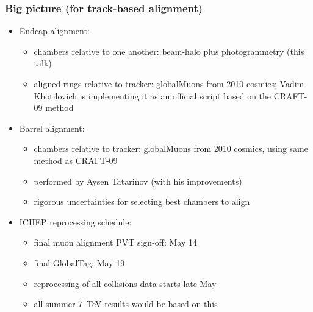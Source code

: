 \documentclass[compress]{beamer}
\begin{document}
\begin{frame}
\frametitle{Big picture {\large (for track-based alignment)}}
\begin{itemize}\setlength{\itemsep}{0.25 cm}
\item Endcap alignment:
\begin{itemize}
\item chambers relative to one another: beam-halo plus photogrammetry (this talk)
\item aligned rings relative to tracker: globalMuons from 2010 cosmics; Vadim Khotilovich is implementing it as an official script based on the CRAFT-09 method
\end{itemize}

\item Barrel alignment:
\begin{itemize}
\item chambers relative to tracker: globalMuons from 2010 cosmics, using same method as CRAFT-09
\item performed by Aysen Tatarinov (with his improvements)
\item rigorous uncertainties for selecting best chambers to align
\end{itemize}

\item ICHEP reprocessing schedule:
\begin{itemize}
\item final muon alignment PVT sign-off: May 14
\item final GlobalTag: May 19
\item reprocessing of all collisions data starts late May
\item all summer 7~TeV results would be based on this
\end{itemize}
\end{itemize}
\label{numpages}
\end{frame}
\end{document}
